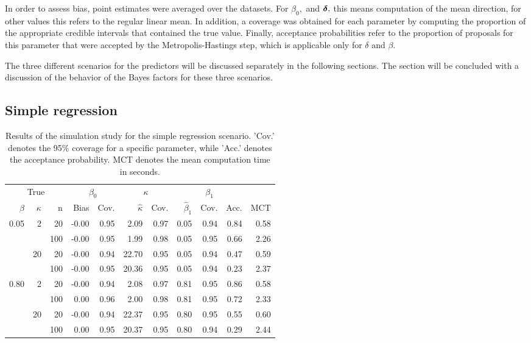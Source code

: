In order to assess bias,  point estimates were  averaged over the datasets. For \( \beta_0,\) and \( \boldsymbol{\delta}, \) this means computation of the mean direction, for other values this refers to the regular linear mean. In addition, a coverage was obtained for each parameter by computing the proportion of the appropriate credible intervals that contained the true value. Finally, acceptance probabilities refer to the proportion of proposals for this parameter that were accepted by the Metropolis-Hastings step, which is applicable only for \( \delta \) and \( \beta \).

The three different scenarios for the predictors will be discussed separately in the following sections.  The section will be concluded with a discussion of the behavior of the Bayes factors for these three scenarios.

\subsection{Simple regression}

\label{SimpleRegression}

\begin{table}[btp]
\centering
\begin{small}
\caption{Results of the simulation study for the simple regression scenario. 'Cov.' denotes the 95\% coverage for a specific parameter, while 'Acc.' denotes the acceptance probability. MCT denotes the mean computation time in seconds.} 
\label{tableOneLinearPredictor}
\begin{tabular}{rrrrrrrrrrr}
  \toprule \multicolumn{3}{c}{True} & \multicolumn{2}{c}{$\beta_0$} & \multicolumn{2}{c}{$\kappa$} & \multicolumn{3}{c}{$\beta_1$} & \\  \cmidrule(lr){1-3} \cmidrule(lr){4-5} \cmidrule(lr){6-7} \cmidrule(lr){8-10}$\beta$ & $\kappa$ & n & Bias  & Cov.  & $\hat{\kappa}$ & Cov.  & $\hat{\beta}_1$ & Cov.  & Acc. & MCT \\ 
  \midrule
0.05 & 2 & 20 & -0.00 & 0.95 & 2.09 & 0.97 & 0.05 & 0.94 & 0.84 & 0.58 \\ 
   \vspace{0.2cm}  &  & 100 & -0.00 & 0.95 & 1.99 & 0.98 & 0.05 & 0.95 & 0.66 & 2.26 \\ 
   & 20 & 20 & -0.00 & 0.94 & 22.70 & 0.95 & 0.05 & 0.94 & 0.47 & 0.59 \\ 
   \vspace{0.2cm}  &  & 100 & -0.00 & 0.95 & 20.36 & 0.95 & 0.05 & 0.94 & 0.23 & 2.37 \\ 
  0.80 & 2 & 20 & -0.00 & 0.94 & 2.08 & 0.97 & 0.81 & 0.95 & 0.86 & 0.58 \\ 
   \vspace{0.2cm}  &  & 100 & 0.00 & 0.96 & 2.00 & 0.98 & 0.81 & 0.95 & 0.72 & 2.33 \\ 
   & 20 & 20 & -0.00 & 0.94 & 22.37 & 0.95 & 0.80 & 0.95 & 0.55 & 0.60 \\ 
   &  & 100 & 0.00 & 0.95 & 20.37 & 0.95 & 0.80 & 0.94 & 0.29 & 2.44 \\ 
   \bottomrule
\end{tabular}
\end{small}
\end{table}


